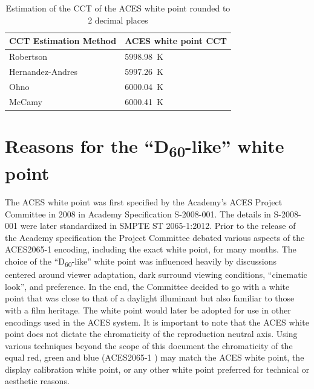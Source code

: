 \begin{table}[!ht]
    \centering
    \begin{tabularx}{.9\linewidth}{|Y|Y|}
    \hline
    \textbf{CCT Estimation Method} & \textbf{ACES white point CCT} \\ \hline
    Robertson & \SI[mode=text]{5998.98}{\kelvin} \\ \hline
    Hernandez-Andres & \SI[mode=text]{5997.26}{\kelvin} \\ \hline
    Ohno & \SI[mode=text]{6000.04}{\kelvin} \\ \hline
	McCamy & \SI[mode=text]{6000.41}{\kelvin} \\ \hline
    \end{tabularx}
    \captionsetup{width=.9\textwidth}
    \caption{Estimation of the CCT of the ACES white point rounded to 2 decimal places \cite{tableValsPython}}
    \label{tab:aceswpcct}
\end{table}

\section{Reasons for the ``\texorpdfstring{D\textsubscript{60}}{D60}-like'' white point}
\label{sec:reasonForD60}
The ACES white point was first specified by the Academy's ACES Project Committee in 2008 in Academy Specification S-2008-001.  The details in S-2008-001 were later standardized in SMPTE ST 2065-1:2012.  Prior to the release of the Academy specification the Project Committee debated various aspects of the ACES2065-1 encoding, including the exact white point, for many months.  The choice of the ``D\textsubscript{60}-like'' white point was influenced heavily by discussions centered around viewer adaptation, dark surround viewing conditions, ``cinematic look'', and preference.  In the end, the Committee decided to go with a white point that was close to that of a daylight illuminant but also familiar to those with a film heritage. The white point would later be adopted for use in other encodings used in the ACES system. It is important to note that the ACES white point does not dictate the chromaticity of the reproduction neutral axis.  Using various techniques beyond the scope of this document the chromaticity of the equal red, green and blue (ACES2065-1 \rgbequal) may match the ACES white point, the display calibration white point, or any other white point preferred for technical or aesthetic reasons.

